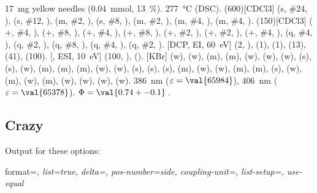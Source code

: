 \documentclass{chemmacros-manual}
\begin{document}
\begin{experimental}[format=\bfseries,delta=(ppm),list=true,use-equal]
   \qty{17}{\milli\gram} yellow needles (\qty{0.04}{\milli\mole},
  \qty{13}{\percent}).
   \qty{277}{\celsius} (DSC).
  \NMR(600)[CDCl3]  (s, \#{24}, ),  (s, \#{12},
  ),  (m, \#{2}, ),  (s, \#{8},
  ),  (m, \#{2}, ),  (m, \#{4},
  ),  (m, \#{4}, ).
  (150)[CDCl3]  ($+$, \#{4}, ),  ($+$,
  \#{8}, ),  ($+$, \#{4}, ),  ($+$, \#{8},
  ),  ($+$, \#{2}, ),  ($+$, \#{2},
  ),  ($+$, \#{4}, ),  (q, \#{4},
  ),  (q, \#{2}, ),  (q, \#{8}, ),
   (q, \#{4}, ),  (q, \#{2}, ).
  [DCP, EI, \qty{60}{\electronvolt}]  (2, ), 
  (1),  (1),  (13),  (41),  (100).
  [, ESI, \qty{10}{\electronvolt}]  (100,
  ),  ().
  [KBr]  (w),  (w),  (m), 
  (m),  (w),  (w),  (w),  (s),
   (s),  (w),  (m),  (m), 
  (m),  (w),  (w),  (s),  (s),
   (s),  (m),  (w),  (w), 
  (m),  (m),  (s),  (w),  (m), 
  (w),  (m),  (w),  (w),  (w), 
  (w).
   \qty{386}{\nano\metre} ($\varepsilon = \val{65984}$),
  \qty{406}{\nano\metre} ($\varepsilon = \val{65378}$).
   $\Phi = \val{0.74+-0.1}$\,.
\end{experimental}

\subsection{Crazy}
Output for these options:

\begin{sourcecode}
  format=\color{red}\itshape,
  list=true,
  delta=\textcolor{green}{},
  pos-number=side,
  coupling-unit=\mega\gram\per\square\second,
  list-setup=,
  use-equal
\end{sourcecode}
\end{document}
